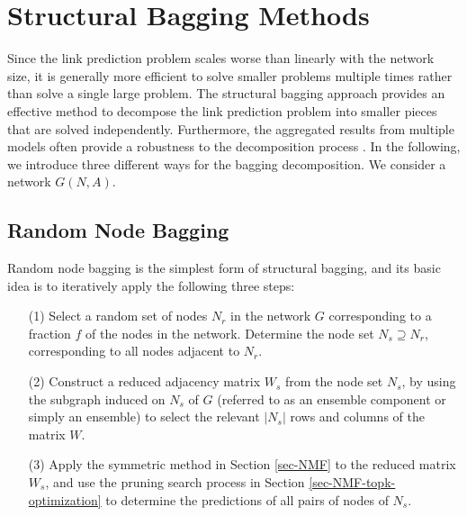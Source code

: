 \section{Structural Bagging Methods}
\label{sec-bagging}
Since the link prediction problem scales worse than linearly with the network size,
it is generally more efficient to solve smaller problems multiple
times rather than solve a single large problem. The structural bagging
approach provides an effective method to decompose the link prediction
problem into smaller pieces that are solved independently.
Furthermore, the aggregated results from multiple models often
provide a robustness to the decomposition process  \cite{Breiman96b-1996}.
In the following, we introduce three different ways for the bagging decomposition.
We consider a network $G(N, A)$.


\subsection{Random Node Bagging}

Random node bagging is the simplest form of structural bagging, and its basic
idea is to iteratively apply the following three steps:


\begin{enumerate}

\item[(1)] Select a random set of nodes $N_r$ in the network $G$ corresponding to
a fraction $f$ of the nodes in the network. Determine the node set
$N_s \supseteq N_r$, corresponding to all nodes adjacent to $N_r$.


\item[(2)]  Construct a reduced adjacency matrix $W_s$ from the node set $N_s$, by using the subgraph
induced on $N_s$ of $G$ (referred to as an ensemble component or simply an ensemble) to select the relevant $|N_s|$ rows and columns of the matrix $W$.

\item[(3)]  Apply the symmetric \NMF method in Section \ref{sec-NMF} to the reduced matrix $W_s$, and use the  pruning search
process in Section \ref{sec-NMF-topk-optimization} to determine the predictions of all pairs of nodes of $N_s$.
\end{enumerate}



